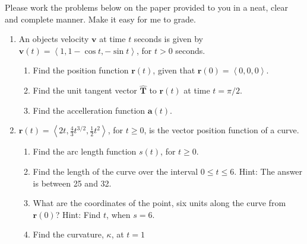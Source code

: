 \documentclass[13pt,letterpaper,fleqn]{article}
\newcommand{\ds}{\displaystyle}
\let\oldhat\hat
\renewcommand{\hat}[1]{\oldhat{\boldsymbol{\mathbf{#1}}}}
\newcommand{\lv}[1]{\ensuremath{\left\langle #1 \right\rangle}}
\renewcommand{\vec}[1]{\ensuremath{\pmb{#1}}}
\renewcommand{\v}[1]{\ensuremath{\vec{#1}}}
\begin{document}
Please work the problems below on the paper provided to you in a neat,
clear and complete manner. Make it easy for me to grade.
\begin{enumerate}
 \item An objects velocity $\vec{v}$ at time $t$ seconds is given by $\v{v}(t) = \lv{1, 1-\cos t, -\sin t}$, for $t > 0$ seconds.
       \begin{enumerate}
        \item Find the position function $\v{r}(t)$, given that $\v{r}(0) = \lv{0,0,0}$.
        \item Find the unit tangent vector $\v{\hat{T}}$ to $\v{r}(t)$ at time $t = \pi/2$.
        \item Find the accelleration function $\v{a}(t)$.
       \end{enumerate}
 \item $\v{r}(t) = \lv{2t, \frac{4}{3}t^{3/2}, \frac{1}{2}t^2}$, for $t \geq 0$, is the vector position function of a curve.
       \begin{enumerate}
        \item Find the arc length function $s(t)$, for $t \geq 0$.
        \item Find the length of the curve over the interval $0 \leq t \leq 6$. Hint: The answer is between 25 and 32.
        \item What are the coordinates of the point, six units along the curve
              from $\v{r}(0)$? Hint: Find $t$, when $s = 6$.
        \item Find the curvature, $\kappa$, at $t = 1$
       \end{enumerate}
\end{enumerate}
\end{document}
